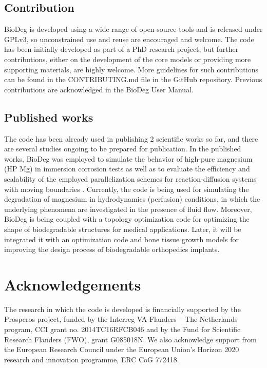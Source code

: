 \subsection{Contribution}

BioDeg is developed using a wide range of open-source tools and is released under GPLv3, so unconstrained use and reuse are encouraged and welcome. The code has been initially developed as part of a PhD research project, but further contributions, either on the development of the core models or providing more supporting materials, are highly welcome. More guidelines for such contributions can be found in the CONTRIBUTING.md file in the GitHub repository. Previous contributions are acknowledged in the BioDeg User Manual.

\subsection{Published works}

The code has been already used in publishing 2 scientific works so far, and there are several studies ongoing to be prepared for publication. In the published works, BioDeg was employed to simulate the behavior of high-pure magnesium (HP Mg) in immersion corrosion tests \cite{Barzegari2021} as well as to evaluate the efficiency and scalability of the employed parallelization schemes for reaction-diffusion systems with moving boundaries \cite{Barzegari2022}. Currently, the code is being used for simulating the degradation of magnesium in hydrodynamics (perfusion) conditions, in which the underlying phenomena are investigated in the presence of fluid flow. Moreover, BioDeg is being coupled with a topology optimization code for optimizing the shape of biodegradable structures for medical applications. Later, it will be integrated it with an optimization code and bone tissue growth models for improving the design process of biodegradable orthopedics implants.

\section{Acknowledgements}

The research in which the code is developed is financially supported by the Prosperos project, funded by the Interreg VA Flanders – The Netherlands program, CCI grant no. 2014TC16RFCB046 and by the Fund for Scientific Research Flanders (FWO), grant G085018N. We also acknowledge support from the European Research Council under the European Union's Horizon 2020 research and innovation programme, ERC CoG 772418.




\cleardoublepage
